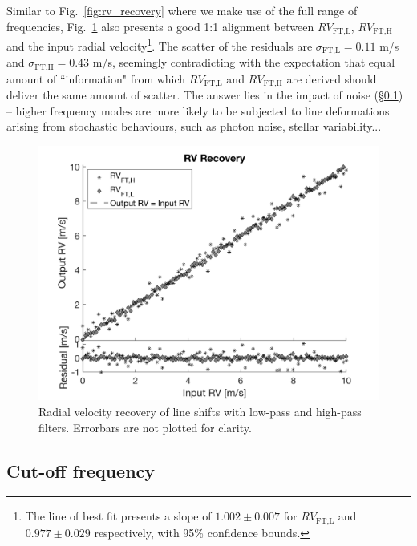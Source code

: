 Similar to Fig.~\ref{fig:rv_recovery} where we make use of the full range of frequencies, Fig.~\ref{fig:rv_recovery_LH} also presents a good 1:1 alignment between $RV_\text{FT,L}$, $RV_\text{FT,H}$ and the input radial velocity\footnote{The line of best fit presents a slope of $1.002\pm0.007$ for $RV_\text{FT,L}$ and $0.977\pm0.029$ respectively, with 95\% confidence bounds.}. The scatter of the residuals are $\sigma_\text{FT,L} = 0.11$ m/s and $\sigma_\text{FT,H} = 0.43$ m/s, seemingly contradicting with the expectation that equal amount of ``information" from which $RV_\text{FT,L}$ and $RV_\text{FT,H}$ are derived should deliver the same amount of scatter. The answer lies in the impact of noise (\S\ref{sec:noise}) -- higher frequency modes are more likely to be subjected to line deformations arising from stochastic behaviours, such as photon noise, stellar variability...

\begin{figure}[tbp]
\centering
\includegraphics[width = 0.7 \linewidth]
{./Figures/Methods/5-LINE_SHIFT_ONLY-HL.png}
\caption[Low-pass and high-pass radial velocities]
{Radial velocity recovery of line shifts with low-pass and high-pass filters. Errorbars are not plotted for clarity.}
\label{fig:rv_recovery_LH}
\end{figure} 
\FloatBarrier

\subsection{Cut-off frequency}
\label{sec:noise}

